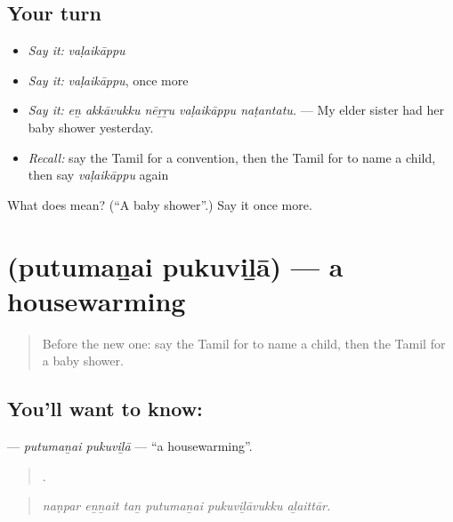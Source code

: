 \subsection*{Your turn}
\begin{itemize}
\raggedright
  \item \emph{Say it:} \emph{vaḷaikāppu}
  \item \emph{Say it:} \emph{vaḷaikāppu}, once more
  \item \emph{Say it:} \emph{eṉ akkāvukku nēṟṟu vaḷaikāppu naṭantatu.} — My elder sister had her baby shower yesterday.
  \item \emph{Recall:} say the Tamil for a convention, then the Tamil for to name a child, then say \emph{vaḷaikāppu} again
\end{itemize}

\begin{tcolorbox}[breakable,colback=teal!4,colframe=teal!35!black,title={Before you move on}]
What does  mean? (\textquotedblleft{}A baby shower\textquotedblright{}.) Say it once more.
\end{tcolorbox}
\section[\texorpdfstring{\ta{புதுமனை} \ta{புகுவிழா} (putumaṉai pukuviḻā)}{புதுமனை புகுவிழா (putumaṉai pukuviḻā)}]{  (putumaṉai pukuviḻā) — a housewarming}

\label{lesson:TA-C321-putumanai-pukuvila}



\begin{quote}
Before the new one: say the Tamil for to name a child, then the Tamil for a baby shower.
\end{quote}

\subsection*{You'll want to know:  }
\textbf{ } — \emph{putumaṉai pukuviḻā} — \textquotedblleft{}a housewarming\textquotedblright{}.

\begin{quote}
     .
\end{quote}

\begin{quote}
\emph{naṇpar eṉṉait taṉ putumaṉai pukuviḻāvukku aḻaittār.}
\end{quote}

